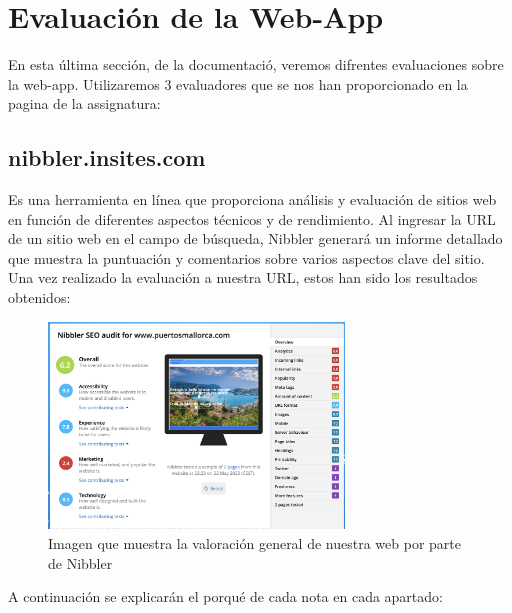 \documentclass{article}
\begin{document}
\section{Evaluación de la Web-App}
En esta última sección, de la documentació, veremos difrentes evaluaciones sobre la web-app. Utilizaremos 3 evaluadores que se nos han proporcionado en la pagina de la assignatura:
\subsection{nibbler.insites.com}
Es una herramienta en línea que proporciona análisis y evaluación de sitios web en función de diferentes aspectos técnicos y de rendimiento. Al ingresar la URL de un sitio web en el campo de búsqueda, Nibbler generará un informe detallado que muestra la puntuación y comentarios sobre varios aspectos clave del sitio.\\

\noindent Una vez realizado la evaluación a nuestra URL, estos han sido los resultados obtenidos:
\begin{figure}[ht]
    \centering
    \includegraphics[width=0.7\textwidth]{images/Nibber.png}
    \caption{Imagen que muestra la valoración general de nuestra web por parte de Nibbler}
\end{figure}
A continuación se explicarán el porqué de cada nota en cada apartado:
\end{document}
